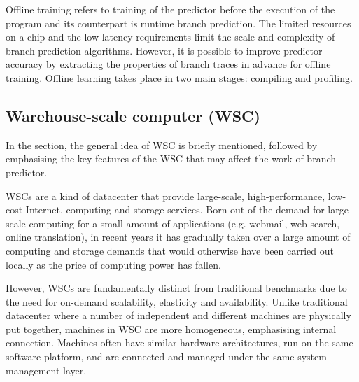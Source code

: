 Offline training refers to training of the predictor before the execution of the program and its counterpart is runtime branch prediction. The limited resources on a chip and the low latency requirements limit the scale and complexity of branch prediction algorithms. However, it is possible to improve predictor accuracy by extracting the properties of branch traces in advance for offline training. Offline learning takes place in two main stages: compiling and profiling.

\subsection{Warehouse-scale computer (WSC)} %

In the section, the general idea of WSC is briefly mentioned, followed by emphasising the key features of the WSC that may affect the work of branch predictor. \par\hspace*{\fill}\par

WSCs are a kind of datacenter that provide large-scale, high-performance, low-cost Internet, computing and storage services\cite{barroso_datacenter_2013}. Born out of the demand for large-scale computing for a small amount of applications (e.g. webmail, web search, online translation), in recent years it has gradually taken over a large amount of computing and storage demands that would otherwise have been carried out locally as the price of computing power has fallen. \par\hspace*{\fill}\par

However, WSCs are fundamentally distinct from traditional benchmarks due to the need for on-demand scalability, elasticity and availability. Unlike traditional datacenter where a number of independent and different machines are physically put together, machines in WSC are more homogeneous, emphasising internal connection. Machines often have similar hardware architectures, run on the same software platform, and are connected and managed under the same system management layer. \par\hspace*{\fill}\par

